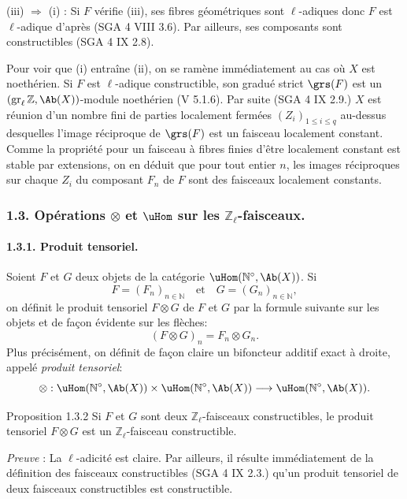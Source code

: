 (iii) \(\Longrightarrow\) (i) : Si \(F\) vérifie (iii), ses fibres géométriques sont \(\ell\)-adiques donc \(F\) est \(\ell\)-adique d'après (SGA 4 VIII 3.6). Par ailleurs, ses composants sont constructibles (SGA 4 IX 2.8).

Pour voir que (i) entraîne (ii), on se ramène immédiatement au cas où \(X\) est noethérien. Si \(F\) est \(\ell\)-adique constructible, son gradué strict \(\grs(F)\) est un \((\operatorname{gr}_\ell\mathbb{Z},\Ab(X))\)-module noethérien (V 5.1.6). Par suite (SGA 4 IX 2.9.) \(X\) est réunion d'un nombre fini de parties localement fermées \((Z_i)_{1\le i\le q}\) au-dessus desquelles l'image réciproque de \(\grs(F)\) est un faisceau localement constant. Comme la propriété pour un faisceau à fibres finies d'être localement constant est stable par extensions, on en déduit que pour tout entier \(n\), les images réciproques sur chaque \(Z_i\) du composant \(F_n\) de \(F\) sont des faisceaux localement constants.

\subsubsection*{1.3. Opérations \(\otimes\) et \(\uHom\) sur les \(\mathbb{Z}_\ell\)-faisceaux.}

\paragraph{1.3.1. Produit tensoriel.}
Soient \(F\) et \(G\) deux objets de la catégorie \(\uHom(\mathbb{N}^\circ,\Ab(X))\). Si
\[
F=(F_n)_{n\in\mathbb{N}}\quad\text{et}\quad G=(G_n)_{n\in\mathbb{N}},
\]
on définit le produit tensoriel \(F\otimes G\) de \(F\) et \(G\) par la formule suivante sur les objets et de façon évidente sur les flèches:
\[
(F\otimes G)_n=F_n\otimes G_n.
\]
Plus précisément, on définit de façon claire un bifoncteur additif exact à droite, appelé \emph{produit tensoriel}:
\[
\otimes:\uHom(\mathbb{N}^\circ,\Ab(X))\times \uHom(\mathbb{N}^\circ,\Ab(X))
\longrightarrow \uHom(\mathbb{N}^\circ,\Ab(X)).
\]

\begin{statement}{Proposition 1.3.2}
Si \(F\) et \(G\) sont deux \(\mathbb{Z}_\ell\)-faisceaux constructibles, le produit tensoriel \(F\otimes G\) est un \(\mathbb{Z}_\ell\)-faisceau constructible.
\end{statement}

\emph{Preuve} : La \(\ell\)-adicité est claire. Par ailleurs, il résulte immédiatement de la définition des faisceaux constructibles (SGA 4 IX 2.3.) qu'un produit tensoriel de deux faisceaux constructibles est constructible.

